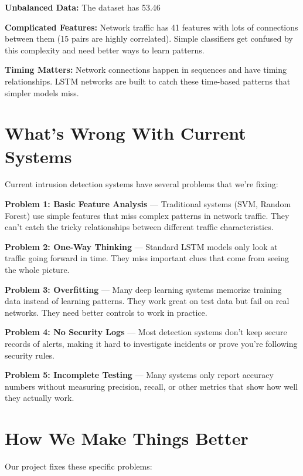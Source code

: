 \documentclass[12pt,a4paper]{report}
\begin{document}
\textbf{Unbalanced Data:} The dataset has 53.46%

\textbf{Complicated Features:} Network traffic has 41 features with lots of connections between them (15 pairs are highly correlated). Simple classifiers get confused by this complexity and need better ways to learn patterns.

\textbf{Timing Matters:} Network connections happen in sequences and have timing relationships. LSTM networks are built to catch these time-based patterns that simpler models miss.

\section{What's Wrong With Current Systems}

Current intrusion detection systems have several problems that we're fixing:

\textbf{Problem 1: Basic Feature Analysis} --- Traditional systems (SVM, Random Forest) use simple features that miss complex patterns in network traffic. They can't catch the tricky relationships between different traffic characteristics.

\textbf{Problem 2: One-Way Thinking} --- Standard LSTM models only look at traffic going forward in time. They miss important clues that come from seeing the whole picture.

\textbf{Problem 3: Overfitting} --- Many deep learning systems memorize training data instead of learning patterns. They work great on test data but fail on real networks. They need better controls to work in practice.

\textbf{Problem 4: No Security Logs} --- Most detection systems don't keep secure records of alerts, making it hard to investigate incidents or prove you're following security rules.

\textbf{Problem 5: Incomplete Testing} --- Many systems only report accuracy numbers without measuring precision, recall, or other metrics that show how well they actually work.

\section{How We Make Things Better}

Our project fixes these specific problems:
\end{document}
